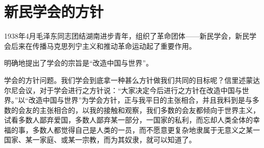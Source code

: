 \section{新民学会的方针}



1938年4月毛泽东同志团结湖南进步青年，组织了革命团体——新民学会，新民学会后来在传播马克思列宁主义和推动革命运动起了重要作用。

明确地提出了学会的宗旨是“改造中国与世界”。

学会的方针问题。我们学会到底拿一种甚么方针做我们共同的目标呢？信里述蒙达尔尼会议，对于学会进行之方针说：“大家决定今后进行之方针在改造中国与世界。”以“改造中国与世界”为学会方针，正与我平日的主张相合，并且我料到是与多数的会友的主张相合的，以我的接触和观察，我们多数的会友都倾向于世界主义，试看多数人鄙弃爱国，多数人鄙弃某一部分，一国家的私利，而忘却人类全体的幸福的事，多数人都觉得自己是人类的一员，而不愿意更复杂地隶属于无意义之某一国家、某一家庭、或某一宗教，而为其奴隶，就可以知道了。

